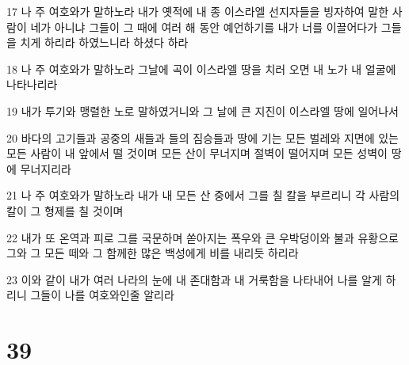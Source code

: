 \par 17 나 주 여호와가 말하노라 내가 옛적에 내 종 이스라엘 선지자들을 빙자하여 말한 사람이 네가 아니냐 그들이 그 때에 여러 해 동안 예언하기를 내가 너를 이끌어다가 그들을 치게 하리라 하였느니라 하셨다 하라
\par 18 나 주 여호와가 말하노라 그날에 곡이 이스라엘 땅을 치러 오면 내 노가 내 얼굴에 나타나리라
\par 19 내가 투기와 맹렬한 노로 말하였거니와 그 날에 큰 지진이 이스라엘 땅에 일어나서
\par 20 바다의 고기들과 공중의 새들과 들의 짐승들과 땅에 기는 모든 벌레와 지면에 있는 모든 사람이 내 앞에서 떨 것이며 모든 산이 무너지며 절벽이 떨어지며 모든 성벽이 땅에 무너지리라
\par 21 나 주 여호와가 말하노라 내가 내 모든 산 중에서 그를 칠 칼을 부르리니 각 사람의 칼이 그 형제를 칠 것이며
\par 22 내가 또 온역과 피로 그를 국문하며 쏟아지는 폭우와 큰 우박덩이와 불과 유황으로 그와 그 모든 떼와 그 함께한 많은 백성에게 비를 내리듯 하리라
\par 23 이와 같이 내가 여러 나라의 눈에 내 존대함과 내 거룩함을 나타내어 나를 알게 하리니 그들이 나를 여호와인줄 알리라

\chapter{39}

